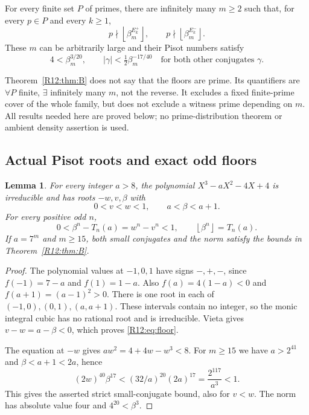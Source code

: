 \documentclass[11pt,a4paper]{article}
\newtheorem{lemma}[theorem]{Lemma}\newtheorem{proposition}[theorem]{Proposition}
\theoremstyle{definition}\newtheorem{definition}[theorem]{Definition}
\theoremstyle{remark}\newtheorem{remark}[theorem]{Remark}
\newcommand{\floor}[1]{\left\lfloor#1\right\rfloor}
\begin{document}
\begin{mainthm}\label{R12:thm:B}
For every finite set $P$ of primes, there are infinitely many $m\ge2$
such that, for every $p\in P$ and every $k\ge1$,
\[
 p\nmid\floor{\beta_m^{E_k^+}},\qquad
 p\nmid\floor{\beta_m^{E_k^-}}.
\]
These $m$ can be arbitrarily large and their Pisot numbers satisfy
\[
 4<\beta_m^{3/20},\qquad
 |\gamma|<\tfrac12\beta_m^{-17/40}
 \quad\text{for both other conjugates }\gamma.
\]
\end{mainthm}

Theorem~\ref{R12:thm:B} does not say that the floors are prime. Its
quantifiers are $\forall P$ finite, $\exists$ infinitely many $m$,
not the reverse. It excludes a fixed finite-prime cover of the whole
family, but does not exclude a witness prime depending on $m$.
All results needed here are proved below; no prime-distribution
theorem or ambient density assertion is used.

\subsection{Actual Pisot roots and exact odd floors}

\begin{lemma}\label{R12:lem:roots}
For every integer $a>8$, the polynomial $X^3-aX^2-4X+4$ is irreducible
and has roots $-w,v,\beta$ with
\[
 0<v<w<1,\qquad a<\beta<a+1.
\]
For every positive odd $n$,
\begin{equation}\label{R12:eq:floor}
 0<\beta^n-T_n(a)=w^n-v^n<1,
 \qquad \floor{\beta^n}=T_n(a).
\end{equation}
If $a=7^m$ and $m\ge15$, both small conjugates and the norm satisfy
the bounds in Theorem~\ref{R12:thm:B}.
\end{lemma}
\begin{proof}
The polynomial values at $-1,0,1$ have signs $-,+,-$, since
$f(-1)=7-a$ and $f(1)=1-a$. Also
$f(a)=4(1-a)<0$ and $f(a+1)=(a-1)^2>0$.
There is one root in each of $(-1,0),(0,1),(a,a+1)$.
These intervals contain no integer, so the monic integral cubic has
no rational root and is irreducible. Vieta gives $v-w=a-\beta<0$,
which proves \eqref{R12:eq:floor}.

The equation at $-w$ gives $aw^2=4+4w-w^3<8$.
For $m\ge15$ we have $a>2^{41}$ and $\beta<a+1<2a$, hence
\[
 (2w)^{40}\beta^{17}
 <(32/a)^{20}(2a)^{17}=\frac{2^{117}}{a^3}<1.
\]
This gives the asserted strict small-conjugate bound, also for $v<w$.
The norm has absolute value four and $4^{20}<\beta^3$.
\end{proof}
\end{document}
